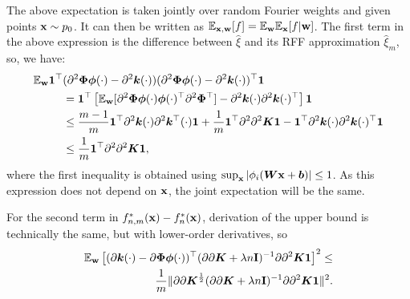 The above expectation is taken jointly over random Fourier weights and given points
${\bf x} \sim p_0$.
It can then be written as
$\mathbb{E}_{{\bf x}, {\bf w}}[f] = \mathbb{E}_{{\bf w}}\mathbb{E}_{{\bf x}}[f | {\bf w}]$.
The first term in the above expression is the difference between $\hat{\xi}$
and its RFF approximation $\hat{\xi}_m$, so, we have:
\begin{align*}
    \mathbb{E}_{{\bf w}}{\bf 1}^{\top}&(\partial^2\bm{\Phi}{\bm \phi}(\cdot) - \partial^2{\bm k}(\cdot))(\partial^2\bm{\Phi}{\bm \phi}(\cdot) - \partial^2{\bm k}(\cdot))^{\top}{\bf 1} \\
    &= {\bf 1}^{\top}\left[\mathbb{E}_{{\bf w}}[\partial^2\bm{\Phi}{\bm \phi}(\cdot){\bm \phi}(\cdot)^{\top}\partial^2\bm{\Phi}^{\top}] - \partial^2{\bm k}(\cdot)\partial^2{\bm k}(\cdot)^{\top}\right]{\bf 1}\\
    &\leq \frac{m - 1}{m}{\bf 1}^{\top}\partial^2{\bm k}(\cdot)\partial^2{\bm k}^{\top}(\cdot){\bf 1} + \frac{1}{m}{\bf 1}^{\top}\partial^2\partial^2{\bm K}{\bf 1} - {\bf 1}^{\top}\partial^2{\bm k}(\cdot)\partial^2{\bm k}(\cdot)^{\top}{\bf 1}\\
    &\leq \frac{1}{m}{\bf 1}^{\top}\partial^2\partial^2{\bm K}{\bf 1},
\end{align*}
where the first inequality is obtained using
$\sup_{\bf x}|\phi_i({\bm W}{\bf x} + {\bm b})| \leq 1$.
As this expression does not depend on ${\bf x}$, the joint expectation will be the same.

For the second term in $f_{n, m}^*({\bf x}) - f_n^*({\bf x})$, derivation of the
upper bound is technically the same, but with lower-order derivatives, so
\begin{align*}
    \mathbb{E}_{{\bf w}}\left[(\partial{\bm k}(\cdot) -
    \partial\bm{\Phi}{\bm \phi}(\cdot))^{\top}(\partial\partial {\bm K} +
    \lambda n{\bf I})^{-1}\partial\partial^2 {\bm K}{\bf 1}\right]^2 \leq \\
    \frac{1}{m}\|\partial\partial {\bm K}^{\frac{1}{2}}(\partial\partial {\bm K} + \lambda n{\bf I})^{-1}\partial\partial^2 {\bm K}{\bf 1}\|^2.
\end{align*}

